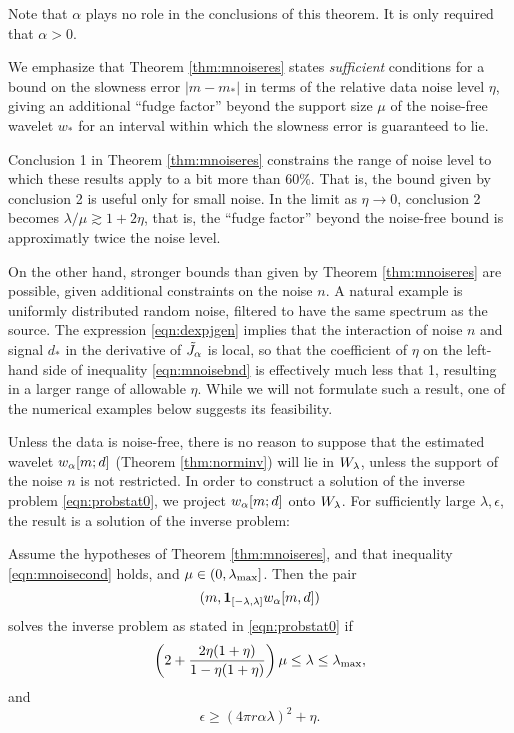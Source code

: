  Note that $\alpha$ plays no role in the
conclusions of this theorem. It is only required that $\alpha >0$.

 We emphasize that Theorem \ref{thm:mnoiseres} states {\em sufficient} conditions for a bound on
the slowness error $|m-m_*|$ in terms of the relative data noise level $\eta$,
giving an additional ``fudge factor'' beyond the support size $\mu$
of the noise-free wavelet $w_*$ for an interval within which the slowness error is
guaranteed to lie.

Conclusion 1 in Theorem \ref{thm:mnoiseres} constrains the range of
noise level to which these results apply to a bit more than 60\%. That
is, the bound given by conclusion 2 is useful only for small noise. In
the limit as $\eta \rightarrow 0$, conclusion 2 becomes
$\lambda/\mu \gtrsim 1 + 2\eta$, that is, the ``fudge factor'' beyond
the noise-free bound is approximatly twice the noise level.

On the other hand, stronger bounds than given by Theorem
\ref{thm:mnoiseres} are possible, given additional constraints on the
noise $n$. A natural example is uniformly distributed random noise,
filtered to have the same spectrum as the source. The expression
\ref{eqn:dexpjgen} implies that the interaction of noise $n$ and
signal $d_*$ in the derivative of $\tilde{J}_{\alpha}$ is local, so that the
coefficient of $\eta$ on the left-hand side of inequality
\ref{eqn:mnoisebnd} is effectively much less that 1, resulting in a
larger range of allowable $\eta$. While we will not formulate such a
result, one of the numerical examples below suggests its feasibility.

Unless the data is noise-free, there is no reason to suppose that the
estimated wavelet $w_{\alpha}[m;d]$ (Theorem \ref{thm:norminv}) will lie in
$W_{\lambda}$, unless the support of the noise $n$ is not restricted. In order
to construct a solution of the inverse problem \ref{eqn:probstat0}, we
project $w_{\alpha}[m;d]$ onto $W_{\lambda}$. For sufficiently large $\lambda,
\epsilon$, the result is a solution of the inverse problem:

\begin{theorem}
  \label{thm:ipnoisesuf}
  Assume the hypotheses of Theorem \ref{thm:mnoiseres}, and that
  inequality \ref{eqn:mnoisecond} holds, and $\mu \in
  (0,\lambda_{\rm max}]$. Then the pair
  \[
    (m,{\bf 1}_{[-\lambda,\lambda]}w_{\alpha}[m,d])
  \]
  solves the inverse problem as stated in \ref{eqn:probstat0} if
  \begin{equation}
    \label{eqn:ipnoiselam}
    \left( 2+\frac{2\eta(1+\eta)}{1-\eta(1+\eta)}\right)\mu \le \lambda
    \le \lambda_{\rm max}, 
  \end{equation}
  and
  \begin{equation}
    \label{eqn:ipnoiseeps}
    \epsilon \ge (4 \pi r \alpha\lambda)^2+\eta. 
  \end{equation}    
\end{theorem}

